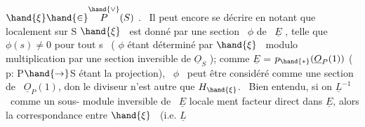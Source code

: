 $\hand{\xi} \hand{\in} \overset{\hand{\vee}}{P}(S)$ . \ Il peut encore se décrire en notant que localement sur S 
 \quad $\hand{\xi}$ \ est donné par une section \ $\phi$ de \ $\underline{E}$ ,  telle
 que $\phi(s) \neq 0$ pour tout s \ ( $\phi$ étant déterminé par $\hand{\xi}$ \ modulo
multiplication par une section inversible de $\underline{O}_S$ ); comme $\underline{E}$ = $p_{\hand{*}}(\underline{O}_P(1))$
( p: P$\hand{\to}$S étant la projection), \ $\phi$ \ peut être considéré comme une section
de \ $\underline{O}_P(1)$, don le diviseur n'est autre que $H_{\hand{\xi}}$. \ Bien entendu, si on
 $\underline{L}^{-1}$ \ comme un sous- module inversible de \ $\underline{E}$ locale
ment facteur direct dans $\underline{E}$, alors la correspondance entre $\hand{\xi}$ \ (i.e. $\underline{L}$ \hand{\unsure{$\xi$,}}

